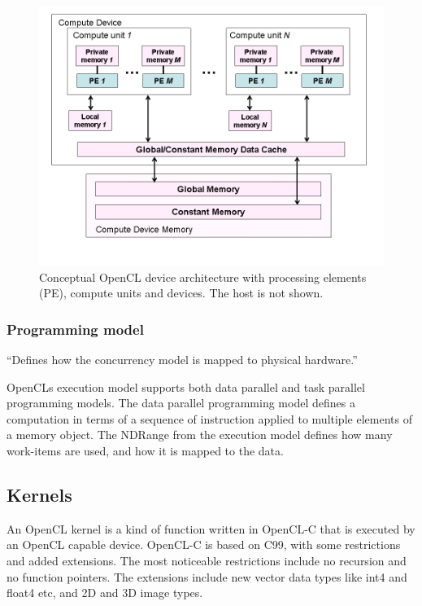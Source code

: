 \begin{figure}[h]
  \includegraphics[width=\textwidth]{images/memory-model.png}
  \caption{Conceptual OpenCL device architecture with processing
    elements (PE), compute units and devices. The host is not shown.}
  \label{execution-model-figure}
\end{figure}



\subsubsection{Programming model}

``Defines how the concurrency model is mapped to physical hardware.''

OpenCLs execution model supports both data parallel and task parallel
programming models. The data parallel programming model defines a
computation in terms of a sequence of instruction applied to multiple
elements of a memory object. The NDRange from the execution model
defines how many work-items are used, and how it is mapped to the
data.



\subsection{Kernels}

An OpenCL kernel is a kind of function written in OpenCL-C that is
executed by an OpenCL capable device. OpenCL-C is based on C99, with
some restrictions and added extensions. The most noticeable
restrictions include no recursion and no function pointers. The
extensions include new vector data types like int4 and float4 etc, and
2D and 3D image types.



